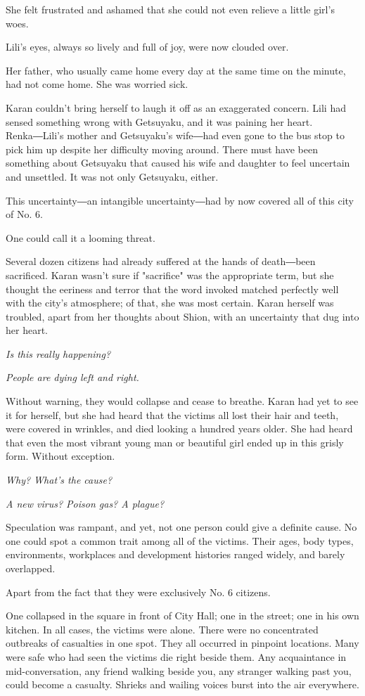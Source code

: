 She felt frustrated and ashamed that she could not even relieve a little
girl's woes.

Lili's eyes, always so lively and full of joy, were now clouded over.

Her father, who usually came home every day at the same time on the
minute, had not come home. She was worried sick.

Karan couldn't bring herself to laugh it off as an exaggerated concern.
Lili had sensed something wrong with Getsuyaku, and it was paining her
heart. Renka―Lili's mother and Getsuyaku's wife―had even gone to the bus
stop to pick him up despite her difficulty moving around. There must
have been something about Getsuyaku that caused his wife and daughter to
feel uncertain and unsettled. It was not only Getsuyaku, either.

This uncertainty―an intangible uncertainty―had by now covered all of
this city of No. 6.

One could call it a looming threat.

Several dozen citizens had already suffered at the hands of death―been
sacrificed. Karan wasn't sure if "sacrifice" was the appropriate term,
but she thought the eeriness and terror that the word invoked matched
perfectly well with the city's atmosphere; of that, she was most
certain. Karan herself was troubled, apart from her thoughts about
Shion, with an uncertainty that dug into her heart.

\emph{Is this really happening?}

\emph{People are dying left and right.}

Without warning, they would collapse and cease to breathe. Karan had yet
to see it for herself, but she had heard that the victims all lost their
hair and teeth, were covered in wrinkles, and died looking a hundred
years older. She had heard that even the most vibrant young man or
beautiful girl ended up in this grisly form. Without exception.

\emph{Why? What's the cause?}

\emph{A new virus? Poison gas? A plague?}

Speculation was rampant, and yet, not one person could give a definite
cause. No one could spot a common trait among all of the victims. Their
ages, body types, environments, workplaces and development histories
ranged widely, and barely overlapped.

Apart from the fact that they were exclusively No. 6 citizens.

One collapsed in the square in front of City Hall; one in the street;
one in his own kitchen. In all cases, the victims were alone. There were
no concentrated outbreaks of casualties in one spot. They all occurred
in pinpoint locations. Many were safe who had seen the victims die right
beside them. Any acquaintance in mid-conversation, any friend walking
beside you, any stranger walking past you, could become a casualty.
Shrieks and wailing voices burst into the air everywhere.

